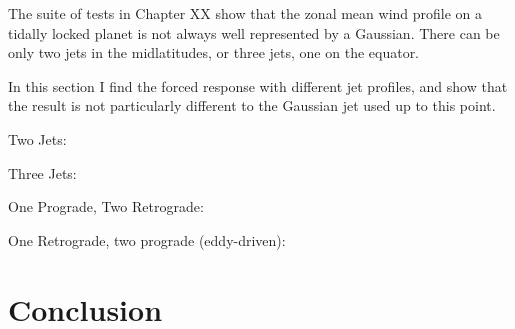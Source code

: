 The suite of tests in Chapter XX show that the zonal mean wind profile on a tidally locked planet is not always well represented by a Gaussian. There can be only two jets in the midlatitudes, or three jets, one on the equator.

In this section I find the forced response with different jet profiles, and show that the result is not particularly different to the Gaussian jet used up to this point.

Two Jets:

Three Jets:

One Prograde, Two Retrograde:

One Retrograde, two prograde (eddy-driven):



\section{Conclusion}









% 
% 
